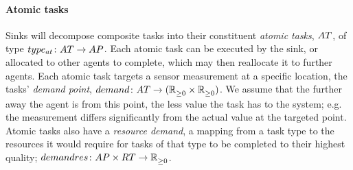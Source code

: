 \newcommand{\formalAtomicTaskType}[2]{
	\functionFormal{type_{\varAtomicTask{}{}}}
	{\setAtomicTask{}{}}
	{\setAtomicTaskType{}{}}
}
\newcommand{\functionAtomicTaskType}[2]{
	\functionSignatyre{type_{\varAtomicTask{}{}}}
	{\varAtomicTask{#1}{#2}}
}

\paragraph{Atomic tasks}
\label{section:problem:atomic_tasks}
Sinks will decompose composite tasks into their constituent \textit{atomic tasks}, $\setAtomicTask{}{}$, of type $\formalAtomicTaskType{}{}$. Each atomic task can be  executed by the sink, or allocated to other agents to complete, which may then reallocate it to further agents. Each atomic task targets a sensor measurement at a specific location, the tasks' \textit{demand point}, $\formalTaskDemandPoint{}{}$. We assume that the further away the agent is from this point, the less value the task has to the system; e.g. the measurement differs significantly from the actual value at the targeted point. Atomic tasks also have a \textit{resource demand}, a mapping from a task type to the resources it would require for tasks of that type to be completed to their highest quality; $\formalRequiredResources{}{}$. 


